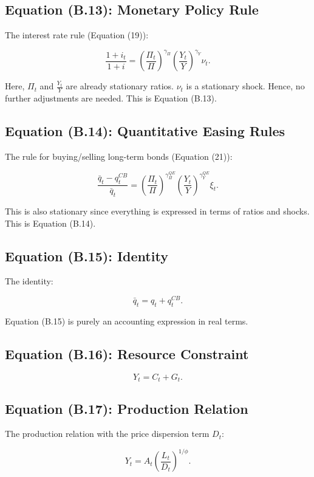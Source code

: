 \documentclass[12pt]{article}
\begin{document}
\subsection{Equation (B.13): Monetary Policy Rule}

The interest rate rule (Equation (19)):

\[
\frac{1 + i_t}{1 + i} = \left(\frac{\Pi_t}{\Pi}\right)^{\gamma_\Pi}\left(\frac{Y_t}{Y}\right)^{\gamma_Y}\nu_t.
\]

Here, \( \Pi_t \) and \( \frac{Y_t}{Y} \) are already stationary ratios. \( \nu_t \) is a stationary shock. Hence, no further adjustments are needed. This is Equation (B.13).


\subsection{Equation (B.14): Quantitative Easing Rules}

The rule for buying/selling long-term bonds (Equation (21)):

\[
\frac{\bar{q}_t - q_t^{CB}}{\bar{q}_t} = \left(\frac{\Pi_t}{\Pi}\right)^{\gamma_\Pi^{QE}}\left(\frac{Y_t}{Y}\right)^{\gamma_Y^{QE}}\xi_t.
\]

This is also stationary since everything is expressed in terms of ratios and shocks. This is Equation (B.14).


\subsection{Equation (B.15): Identity}

The identity:

\[
\bar{q}_t = q_t + q_t^{CB}.
\]

Equation (B.15) is purely an accounting expression in real terms.


\subsection{Equation (B.16): Resource Constraint}

\[
Y_t = C_t + G_t.
\]


\subsection{Equation (B.17): Production Relation}

The production relation with the price dispersion term \( D_t \):

\[
Y_t = A_t \left(\frac{L_t}{D_t}\right)^{1/\phi}.
\]
\end{document}

